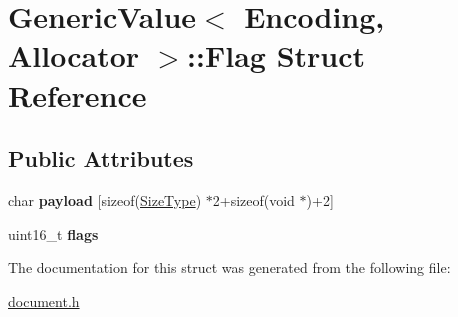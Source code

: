 \hypertarget{a02084}{}\section{Generic\+Value$<$ Encoding, Allocator $>$\+:\+:Flag Struct Reference}
\label{a02084}
\subsection*{Public Attributes}
\begin{DoxyCompactItemize}
\item 
\mbox{\label{a02084_aced7ede2056a797fb80817d45634e3ea}} 
char {\bfseries payload} \mbox{[}sizeof(\hyperlink{a00560_a5ed6e6e67250fadbd041127e6386dcb5}{Size\+Type}) $\ast$2+sizeof(void $\ast$)+2\mbox{]}
\item 
\mbox{\label{a02084_ac91f08067dcc0003fc78e870ca9b2d5d}} 
uint16\+\_\+t {\bfseries flags}
\end{DoxyCompactItemize}


The documentation for this struct was generated from the following file\+:\begin{DoxyCompactItemize}
\item 
\hyperlink{a00476}{document.\+h}\end{DoxyCompactItemize}

